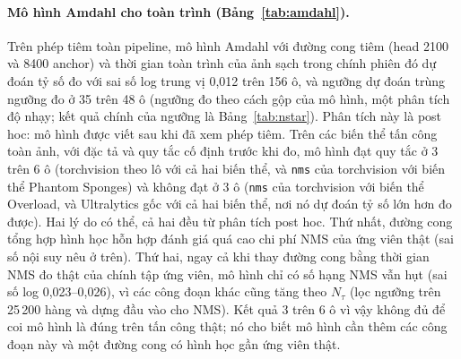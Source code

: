 \documentclass[a4paper,fleqn]{cas-dc}
\newcommand{\Ntau}{N_{\tau}}
\begin{document}
\paragraph{Mô hình Amdahl cho toàn trình (Bảng~\ref{tab:amdahl}).}
Trên phép tiêm toàn pipeline, mô hình Amdahl với đường cong tiêm (head 2100 và 8400 anchor) và thời gian toàn trình của ảnh sạch trong chính phiên đó dự đoán tỷ số đo với sai số log trung vị 0,012 trên 156 ô, và ngưỡng dự đoán trùng ngưỡng đo ở 35 trên 48 ô (ngưỡng đo theo cách gộp của mô hình, một phân tích độ nhạy; kết quả chính của ngưỡng là Bảng~\ref{tab:nstar}). Phân tích này là post hoc: mô hình được viết sau khi đã xem phép tiêm. Trên các biến thể tấn công toàn ảnh, với đặc tả và quy tắc cố định trước khi đo, mô hình đạt quy tắc ở 3 trên 6 ô (torchvision theo lô với cả hai biến thể, và \texttt{nms} của torchvision với biến thể Phantom Sponges) và không đạt ở 3 ô (\texttt{nms} của torchvision với biến thể Overload, và Ultralytics gốc với cả hai biến thể, nơi nó dự đoán tỷ số lớn hơn đo được). Hai lý do có thể, cả hai đều từ phân tích post hoc. Thứ nhất, đường cong tổng hợp hình học hỗn hợp đánh giá quá cao chi phí NMS của ứng viên thật (sai số nội suy nêu ở trên). Thứ hai, ngay cả khi thay đường cong bằng thời gian NMS đo thật của chính tập ứng viên, mô hình chỉ có số hạng NMS vẫn hụt (sai số log 0,023--0,026), vì các công đoạn khác cũng tăng theo $\Ntau$ (lọc ngưỡng trên 25\,200 hàng và dựng đầu vào cho NMS). Kết quả 3 trên 6 ô vì vậy không đủ để coi mô hình là đúng trên tấn công thật; nó cho biết mô hình cần thêm các công đoạn này và một đường cong có hình học gần ứng viên thật.
\end{document}
